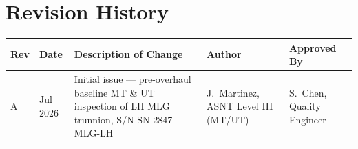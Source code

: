 \section{Revision History}
\begin{tabularx}{\linewidth}{@{}>{\centering\arraybackslash}p{12mm}>{\centering\arraybackslash}p{24mm}>{\raggedright\arraybackslash}X>{\centering\arraybackslash}p{30mm}>{\centering\arraybackslash}p{30mm}@{}}
  \toprule
  \rowcolor{primary!12}
  \textbf{Rev} & \textbf{Date} & \textbf{Description of Change} & \textbf{Author} & \textbf{Approved By} \\
  \midrule
  A & 09 Jul 2026 & Initial issue --- pre-overhaul baseline MT \& UT inspection of LH MLG trunnion, S/N SN-2847-MLG-LH & J.\ Martinez, ASNT Level III (MT/UT) & S.\ Chen, Quality Engineer \\
  \bottomrule
\end{tabularx}

